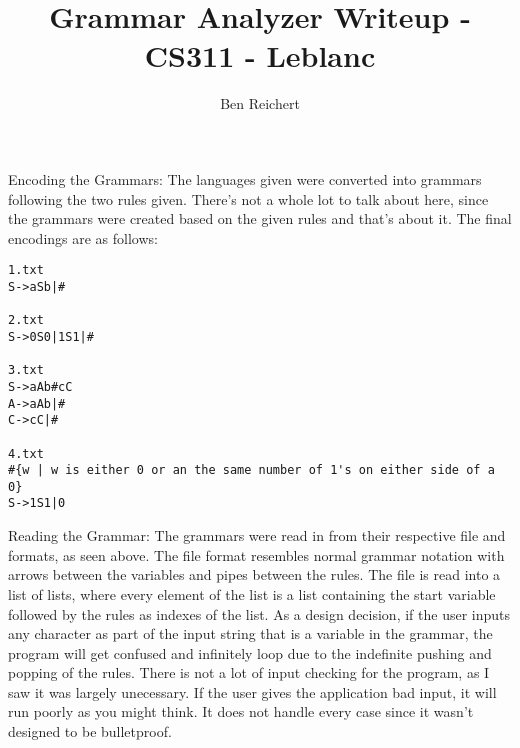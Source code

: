 \documentclass{article}
\begin{document}
\title{Grammar Analyzer Writeup - CS311 - Leblanc}
\author{Ben Reichert}

\maketitle





Encoding the Grammars: The languages given were converted into grammars following the two rules given. There's not a whole lot to talk about here, since the grammars were created based on the given rules and that's about it. The final encodings are as follows:

\begin{lstlisting}
1.txt
S->aSb|#

2.txt
S->0S0|1S1|#

3.txt
S->aAb#cC
A->aAb|#
C->cC|#

4.txt
#{w | w is either 0 or an the same number of 1's on either side of a 0}
S->1S1|0
\end{lstlisting}


Reading the Grammar: The grammars were read in from their respective file and formats, as seen above. The file format resembles normal grammar notation with arrows between the variables and pipes between the rules. The file is read into a list of lists, where every element of the list is a list containing the start variable followed by the rules as indexes of the list. As a design decision, if the user inputs any character as part of the input string that is a variable in the grammar, the program will get confused and infinitely loop due to the indefinite pushing and popping of the rules. There is not a lot of input checking for the program, as I saw it was largely unecessary. If the user gives the application bad input, it will run poorly as you might think. It does not handle every case since it wasn't designed to be bulletproof. 
\end{document}
